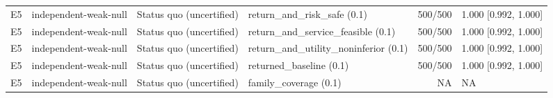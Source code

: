 \begin{longtable}{p{.04\linewidth}p{.18\linewidth}p{.19\linewidth}p{.16\linewidth}r p{.21\linewidth}}
E5 & independent-weak-null & Status quo (uncertified) & return\_and\_risk\_safe (0.1) & 500/500 & 1.000 [0.992, 1.000]\\
E5 & independent-weak-null & Status quo (uncertified) & return\_and\_service\_feasible (0.1) & 500/500 & 1.000 [0.992, 1.000]\\
E5 & independent-weak-null & Status quo (uncertified) & return\_and\_utility\_noninferior (0.1) & 500/500 & 1.000 [0.992, 1.000]\\
E5 & independent-weak-null & Status quo (uncertified) & returned\_baseline (0.1) & 500/500 & 1.000 [0.992, 1.000]\\
E5 & independent-weak-null & Status quo (uncertified) & family\_coverage (0.1) & NA & NA\\
\bottomrule\end{longtable}\endgroup
